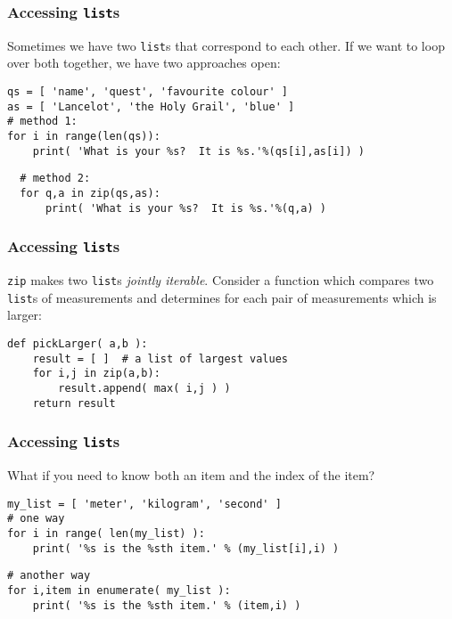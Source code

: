\documentclass[11pt]{beamer}
\begin{document}
\begin{frame}[fragile]
  \frametitle{Accessing \texttt{list}s}

  \begin{enumerate}
  \myitem  Sometimes we have two \texttt{list}s that correspond to each other.
  \myitem  If we want to loop over both together, we have two approaches open:
  \end{enumerate}
  \begin{Verbatim}
qs = [ 'name', 'quest', 'favourite colour' ]
as = [ 'Lancelot', 'the Holy Grail', 'blue' ]
# method 1:
for i in range(len(qs)):
    print( 'What is your %s?  It is %s.'%(qs[i],as[i]) )
  \end{Verbatim}
  \pause
  \begin{Verbatim}
  # method 2:
  for q,a in zip(qs,as):
      print( 'What is your %s?  It is %s.'%(q,a) )
  \end{Verbatim}
\end{frame}

\begin{frame}[fragile]
  \frametitle{Accessing \texttt{list}s}
  \Enlarge

  \begin{enumerate}
  \myitem  \texttt{zip} makes two \texttt{list}s \emph{jointly iterable}.
  \myitem  Consider a function which compares two \texttt{list}s of measurements and determines for each pair of measurements which is larger:
  \end{enumerate}
  \begin{Verbatim}
def pickLarger( a,b ):
    result = [ ]  # a list of largest values
    for i,j in zip(a,b):
        result.append( max( i,j ) )
    return result
  \end{Verbatim}
\end{frame}

\begin{frame}[fragile]
  \frametitle{Accessing \texttt{list}s}
  \Enlarge

  \begin{enumerate}
  \myitem  What if you need to know both an item and the index of the item?
  \end{enumerate}
  \begin{Verbatim}
my_list = [ 'meter', 'kilogram', 'second' ]
# one way
for i in range( len(my_list) ):
    print( '%s is the %sth item.' % (my_list[i],i) )
  \end{Verbatim}
  \pause
  \begin{Verbatim}
# another way
for i,item in enumerate( my_list ):
    print( '%s is the %sth item.' % (item,i) )
  \end{Verbatim}
\end{frame}
\end{document}
